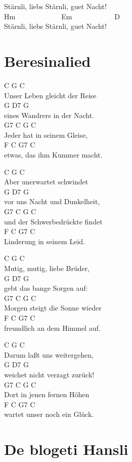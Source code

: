 \documentclass[
  letterpaper,
  a5paper]{memoir}
\begin{document}
Stärnli, liebs Stärnli, guet Nacht!\\
Hm~~~~~~~~~~~~~Em~~~~~~~~~~~~D\\
Stärnli, liebs Stärnli, guet Nacht!

\hypertarget{beresinalied}{%
\chapter{Beresinalied}\label{beresinalied}}

C G C\\
Unser Leben gleicht der Reise\\
G D7 G\\
eines Wandrers in der Nacht.\\
G7 C G C\\
Jeder hat in seinem Gleise,\\
F C G7 C\\
etwas, das ihm Kummer macht.

C G C\\
Aber unerwartet schwindet\\
G D7 G\\
vor uns Nacht und Dunkelheit,\\
G7 C G C\\
und der Schwerbedrückte findet\\
F C G7 C\\
Linderung in seinem Leid.

C G C\\
Mutig, mutig, liebe Brüder,\\
G D7 G\\
gebt das bange Sorgen auf:\\
G7 C G C\\
Morgen steigt die Sonne wieder\\
F C G7 C\\
freundlich an dem Himmel auf.

C G C\\
Darum laßt uns weitergehen,\\
G D7 G\\
weichet nicht verzagt zurück!\\
G7 C G C\\
Dort in jenen fernen Höhen\\
F C G7 C\\
wartet unser noch ein Glück.

\hypertarget{de-blogeti-hansli}{%
\chapter{De blogeti Hansli}\label{de-blogeti-hansli}}
\end{document}
